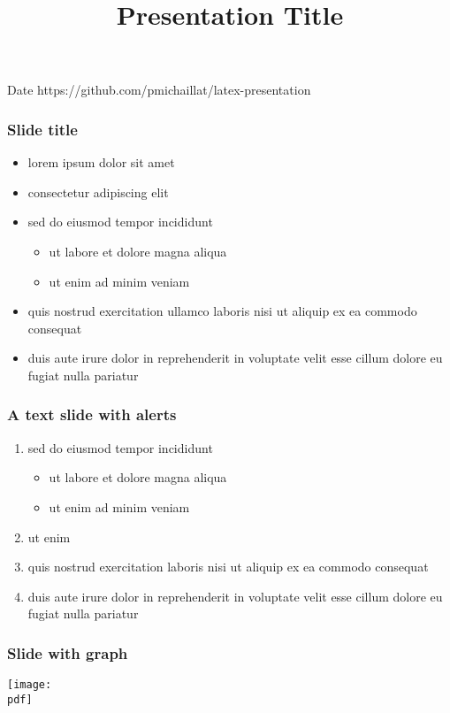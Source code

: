 \documentclass[12pt,xcolor={dvipsnames},hyperref={pdftex,pdfpagemode=UseNone,hidelinks,pdfdisplaydoctitle=true},usepdftitle=false]{beamer}
\def\pdf{figures.pdf}
\begin{document}
\title{Presentation Title}
%
{Date}%
{https://github.com/pmichaillat/latex-presentation}
\frame[plain]{\titlepage}

\begin{frame}
\frametitle{Slide title}
\begin{itemize}
\item lorem ipsum dolor sit amet
\item consectetur adipiscing elit
\item sed do eiusmod tempor incididunt
\begin{itemize}
\item  ut labore et dolore magna aliqua
\item ut enim ad minim veniam
\end{itemize}
\item quis nostrud exercitation ullamco laboris nisi ut aliquip ex ea commodo consequat
\item duis aute irure dolor in reprehenderit in voluptate velit esse cillum dolore eu fugiat nulla pariatur
\end{itemize}
\end{frame}

\begin{frame}
\frametitle{A text slide with alerts}
\begin{enumerate}
\item sed do eiusmod tempor incididunt
\begin{itemize}
\item ut labore et dolore magna aliqua
\item ut enim ad minim veniam
\end{itemize}
\item ut enim 
\item quis nostrud exercitation  laboris nisi ut aliquip ex ea commodo consequat
\item[\then] duis aute irure dolor in reprehenderit in voluptate velit esse cillum dolore eu fugiat nulla pariatur
\end{enumerate}
\end{frame}


\begin{frame}
\end{frame}

\begin{frame}
\frametitle{Slide with graph}
\texttt{[image: \\pdf]}%
\end{frame}
\end{document}

